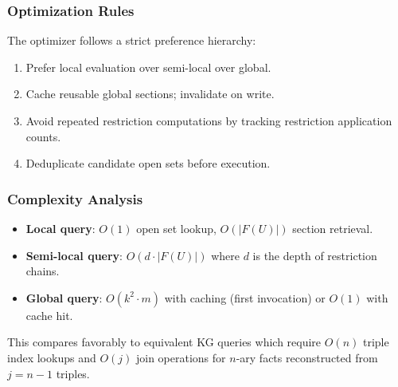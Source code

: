 \subsubsection{Optimization Rules}

The optimizer follows a strict preference hierarchy:

\begin{enumerate}
    \item Prefer local evaluation over semi-local over global.
    \item Cache reusable global sections; invalidate on write.
    \item Avoid repeated restriction computations by tracking restriction application counts.
    \item Deduplicate candidate open sets before execution.
\end{enumerate}

\subsubsection{Complexity Analysis}

\begin{itemize}
    \item \textbf{Local query}: $O(1)$ open set lookup, $O(|F(U)|)$ section retrieval.
    \item \textbf{Semi-local query}: $O(d \cdot |F(U)|)$ where $d$ is the depth of restriction chains.
    \item \textbf{Global query}: $O(k^2 \cdot m)$ with caching (first invocation) or $O(1)$ with cache hit.
\end{itemize}

\noindent This compares favorably to equivalent KG queries which require $O(n)$ triple index lookups and $O(j)$ join operations for $n$-ary facts reconstructed from $j = n-1$ triples.
\endinput

